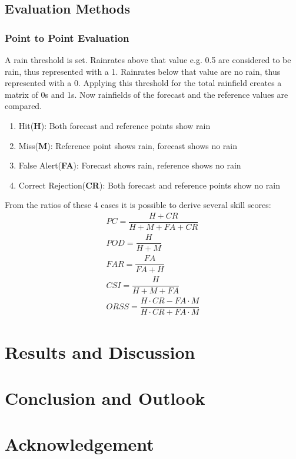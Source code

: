 \documentclass[11pt,twoside,a4paper,fleqn,x11names]{report}
\numberwithin{equation}{chapter}
\numberwithin{figure}{chapter}
\numberwithin{table}{chapter}
\begin{document}
\section{Evaluation Methods}
\label{subsec:eval}
\subsection{Point to Point Evaluation}
A rain threshold is set. Rainrates above that value e.g. 0.5 are considered to be rain, thus represented with a 1. Rainrates below that value are no rain, thus represented with a 0. Applying this threshold for the total rainfield creates a matrix of 0s and 1s. Now rainfields of the forecast and the reference values are compared.
\begin{enumerate}
	\item Hit(\textbf{H}): Both forecast and reference points show rain
	\item Miss(\textbf{M}): Reference point shows rain, forecast shows no rain
	\item False Alert(\textbf{FA}): Forecast shows rain, reference shows no rain
	\item Correct Rejection(\textbf{CR}): Both forecast and reference points show no rain
\end{enumerate}
From the ratios of these 4 cases it is possible to derive several skill scores:
\begin{equation}
\begin{array}{lcl}
	PC = \dfrac{H+CR}{H+M+FA+CR}\\
	POD = \dfrac{H}{H+M}\\
	FAR = \dfrac{FA}{FA+H}\\
	CSI = \dfrac{H}{H+M+FA}\\
	ORSS = \dfrac{H\cdot CR-FA\cdot M}{H\cdot CR+FA\cdot M}
\end{array}
\end{equation}
\chapter{Results and Discussion}
\chapter{Conclusion and Outlook}
\chapter{Acknowledgement}

\end{document}
